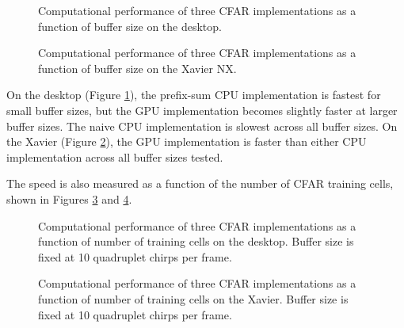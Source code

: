 \begin{figure}[htbp]
    \centering
    \caption[CFAR implementation speed vs buffer size on the desktop.]{Computational
    performance of three CFAR implementations as a function of buffer size on the desktop.}
    \label{fig:cfar-implementation-performance-desktop}
\end{figure}

\begin{figure}[htbp]
    \centering
    \caption[CFAR implementation speed vs buffer size on the Xavier.]{Computational
    performance of three CFAR implementations as a function of buffer size on the Xavier NX.}
    \label{fig:cfar-implementation-performance-Xavier}
\end{figure}

On the desktop (Figure \ref{fig:cfar-implementation-performance-desktop}), the prefix-sum
CPU implementation is fastest for small buffer sizes, but the GPU implementation becomes
slightly faster at larger buffer sizes. The naive CPU implementation is slowest across all
buffer sizes. On the Xavier (Figure \ref{fig:cfar-implementation-performance-Xavier}), the
GPU implementation is faster than either CPU implementation across all buffer sizes tested.

The speed is also measured as a function of the number of CFAR training cells, shown in
Figures \ref{fig:cfar-implementation-performance-desktop-training-cells} and
\ref{fig:cfar-implementation-performance-Xavier-training-cells}.

\begin{figure}
    \centering
    
    \caption[CFAR implementation speed vs training cells on the desktop.]{Computational
    performance of three CFAR implementations as a function of number of training cells on
    the desktop. Buffer size is fixed at 10 quadruplet chirps per frame.}
    \label{fig:cfar-implementation-performance-desktop-training-cells}
\end{figure}

\begin{figure}
    \centering
    
    \caption[CFAR implementation speed vs training cells on the Xavier.]{Computational
    performance of three CFAR implementations as a function of number of training cells on
    the Xavier. Buffer size is fixed at 10 quadruplet chirps per frame.}
    \label{fig:cfar-implementation-performance-Xavier-training-cells}
\end{figure}

